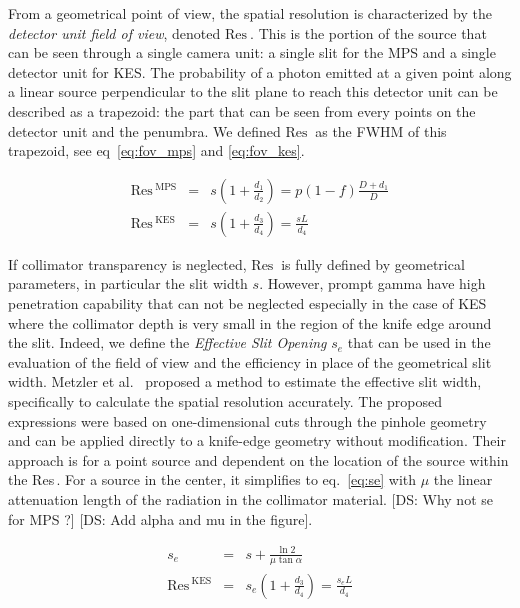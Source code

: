 \documentclass[a4paper,english]{article}
\newcommand\ds[1]{\color{orange}[DS: #1]\color{black}}
\begin{document}
\newcommand\FOV{\textrm{Res}\,}
\newcommand\MPS{\textrm{MPS}}
\newcommand\KES{\textrm{KES}}
\newcommand\du{}
\newcommand\DE{\textrm{Eff}\,}

From a geometrical point of view, the spatial resolution is characterized by the
\textit{detector unit field of view}, denoted $\FOV_{\du}$. This is the portion of
the source that can be seen through a single camera unit: a single slit for the
MPS and a single detector unit for KES. The probability of a photon emitted at a
given point along a linear source perpendicular to the slit plane to reach
this detector unit can be described as a trapezoid: the part that can be seen
from every points on the detector unit and the penumbra. We defined $\FOV_{\du}$
as the FWHM of this trapezoid, see eq~\ref{eq:fov_mps} and \ref{eq:fov_kes}.

\begin{eqnarray}
  \label{eq:fov_mps}
  \FOV_{\du}^{\MPS} & = & s\left(1+ \frac{d_1}{d_2}\right) = p(1-f) \frac{D+d_1}{D} \\
  \label{eq:fov_kes}
   \FOV_{\du}^{\KES} & = & s\left(1+ \frac{d_3}{d_4}\right) = \frac{sL}{d_4}
\end{eqnarray}

If collimator transparency is neglected, $\FOV_{\du}$ is fully defined by
geometrical parameters, in particular the slit width $s$. However, prompt gamma
have high penetration capability that can not be neglected especially in the
case of KES where the collimator depth is very small in the region of the knife
edge around the slit. Indeed, we define the \textit{Effective Slit Opening}
$s_e$ that can be used in the evaluation of the field of view and the efficiency
in place of the geometrical slit width. Metzler et al.~\cite{Metzler2005}
proposed a method to estimate the effective slit width, specifically to calculate
the spatial resolution accurately. The proposed expressions were based on
one-dimensional cuts through the pinhole geometry and can be applied directly to
a knife-edge geometry without modification. Their approach is for a point source
and dependent on the location of the source within the \FOV. For a source in the
center, it simplifies to eq.~\ref{eq:se} with $\mu$ the linear attenuation
length of the radiation in the collimator material. \ds{Why not se for MPS ?}
\ds{Add alpha and mu in the figure}.

\begin{eqnarray}
  s_e & = & s + \frac{\ln2}{\mu\tan\alpha}   \label{eq:se} \\
   \FOV_{\du}^{\KES} & = & s_e\left(1+ \frac{d_3}{d_4}\right) = \frac{s_eL}{d_4}          
  \label{eq:fov_kes_se}
\end{eqnarray}
\end{document}
